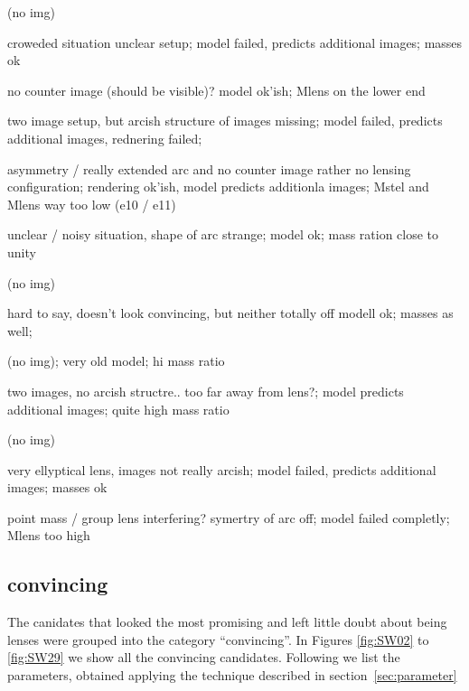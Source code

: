   (no img)
  
  croweded situation unclear setup;
  model failed, predicts additional images;
  masses ok
  
  no counter image (should be visible)?
  model ok'ish;
  Mlens on the lower end
  
  two image setup, but arcish structure of images missing;
  model failed, predicts additional images, rednering failed;
  
  asymmetry / really extended arc and no counter image rather no lensing configuration;
  rendering ok'ish, model predicts additionla images;
  Mstel and Mlens way too low (e10 / e11)
  
  unclear / noisy situation, shape of arc strange;
  model ok;
  mass ration close to unity
  
  (no img)
  
  hard to say, doesn't look convincing, but neither totally off
  modell ok;
  masses as well;
  
  (no img);
  very old model;
  hi mass ratio
  
  two images, no arcish structre.. too far away from lens?;
  model predicts additional images;
  quite high mass ratio
  
  (no img)
  
  very ellyptical lens, images not really arcish;
  model failed, predicts additional images;
  masses ok
  
  point mass / group lens interfering? symertry of arc off;
  model failed completly;
  Mlens too high
  


\subsection{convincing}

The canidates that looked the most promising and left little doubt about being lenses were grouped into the category ``convincing''.
In Figures \ref{fig:SW02} to \ref{fig:SW29} we show all the convincing candidates.
Following we list the parameters, obtained applying the technique described in section~\ref{sec:parameter}

